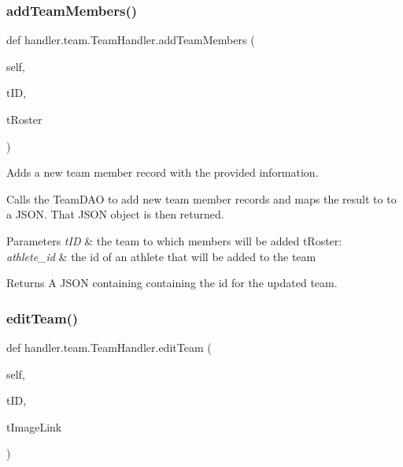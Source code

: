 \subsubsection{\texorpdfstring{add\+Team\+Members()}{addTeamMembers()}}
{\footnotesize\ttfamily def handler.\+team.\+Team\+Handler.\+add\+Team\+Members (\begin{DoxyParamCaption}\item[{}]{self,  }\item[{}]{t\+ID,  }\item[{}]{t\+Roster }\end{DoxyParamCaption})}



Adds a new team member record with the provided information. 

Calls the Team\+D\+AO to add new team member records and maps the result to to a J\+S\+ON. That J\+S\+ON object is then returned.


\begin{DoxyParams}{Parameters}
{\em t\+ID} & the team to which members will be added t\+Roster\+: \\
\hline
{\em athlete\+\_\+id} & the id of an athlete that will be added to the team \\
\hline
\end{DoxyParams}
\begin{DoxyReturn}{Returns}
A J\+S\+ON containing containing the id for the updated team. 
\end{DoxyReturn}
\mbox{\label{classhandler_1_1team_1_1_team_handler_a9fc42144b674bd9901dd1100cd8e389e}} 
\subsubsection{\texorpdfstring{edit\+Team()}{editTeam()}}
{\footnotesize\ttfamily def handler.\+team.\+Team\+Handler.\+edit\+Team (\begin{DoxyParamCaption}\item[{}]{self,  }\item[{}]{t\+ID,  }\item[{}]{t\+Image\+Link }\end{DoxyParamCaption})}



